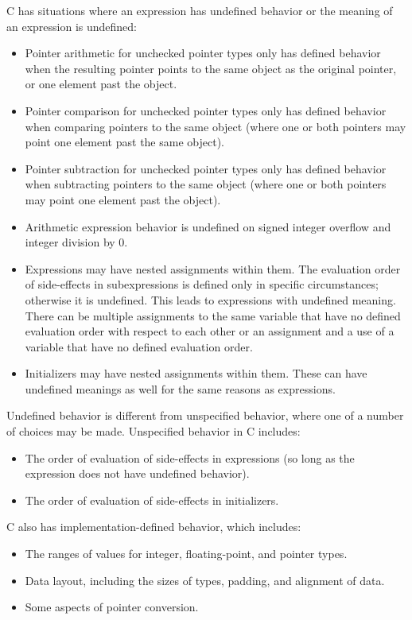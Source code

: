 C has situations where an expression has undefined behavior or the
meaning of an expression is undefined:

\begin{itemize}
\item
  Pointer arithmetic for unchecked pointer types only has defined behavior when
  the resulting pointer points to the same object as the original pointer, or one
  element past the object.
\item
  Pointer comparison for unchecked pointer types only has defined behavior when comparing
  pointers to the same object (where one or both pointers may point one
  element past the same object).
\item
  Pointer subtraction for unchecked pointer types only has defined behavior when subtracting
  pointers to the same object (where one or both pointers may point one
  element past the object).
\item
  Arithmetic expression behavior is undefined on signed integer overflow
  and integer division by 0.
\item
  Expressions may have nested assignments within them. The evaluation
  order of side-effects in subexpressions is defined only in specific
  circumstances; otherwise it is undefined. This leads to expressions
  with undefined meaning. There can be multiple assignments to the same
  variable that have no defined evaluation order with respect to each
  other or an assignment and a use of a variable that have no defined
  evaluation order.
\item
  Initializers may have nested assignments within them. These can have
  undefined meanings as well for the same reasons as expressions.
\end{itemize}

Undefined behavior is different from unspecified behavior, where one of
a number of choices may be made. Unspecified behavior in C includes:

\begin{itemize}
\item
  The order of evaluation of side-effects in expressions (so long as the
  expression does not have undefined behavior).
\item
  The order of evaluation of side-effects in initializers.
\end{itemize}

C also has implementation-defined behavior, which includes:

\begin{itemize}
\item
  The ranges of values for integer, floating-point, and pointer types.
\item
  Data layout, including the sizes of types, padding, and alignment of
  data.
\item
  Some aspects of pointer conversion.
\end{itemize}

